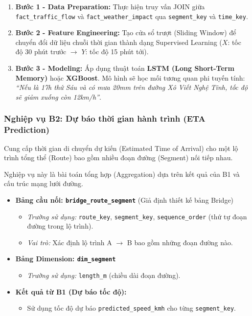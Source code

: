 \begin{enumerate}
    \item \textbf{Bước 1 - Data Preparation:} Thực hiện truy vấn JOIN giữa \texttt{fact\_traffic\_flow} và \texttt{fact\_weather\_impact} qua \texttt{segment\_key} và \texttt{time\_key}.
    \item \textbf{Bước 2 - Feature Engineering:} Tạo cửa sổ trượt (Sliding Window) để chuyển đổi dữ liệu chuỗi thời gian thành dạng Supervised Learning ($X$: tốc độ 30 phút trước $\rightarrow$ $Y$: tốc độ 15 phút tới).
    \item \textbf{Bước 3 - Modeling:} Áp dụng thuật toán \textbf{LSTM (Long Short-Term Memory)} hoặc \textbf{XGBoost}. Mô hình sẽ học mối tương quan phi tuyến tính: \textit{“Nếu là 17h thứ Sáu và có mưa 20mm trên đường Xô Viết Nghệ Tĩnh, tốc độ sẽ giảm xuống còn 12km/h”}.
\end{enumerate}

\subsubsection{Nghiệp vụ B2: Dự báo thời gian hành trình (ETA Prediction)}

Cung cấp thời gian di chuyển dự kiến (Estimated Time of Arrival) cho một lộ trình tổng thể (Route) bao gồm nhiều đoạn đường (Segment) nối tiếp nhau.

Nghiệp vụ này là bài toán tổng hợp (Aggregation) dựa trên kết quả của B1 và cấu trúc mạng lưới đường.

\begin{itemize}
    \item \textbf{Bảng cầu nối: \texttt{bridge\_route\_segment}} (Giả định thiết kế bảng Bridge)
    \begin{itemize}
        \item \textit{Trường sử dụng:} \texttt{route\_key}, \texttt{segment\_key}, \texttt{sequence\_order} (thứ tự đoạn đường trong lộ trình).
        \item \textit{Vai trò:} Xác định lộ trình A $\rightarrow$ B bao gồm những đoạn đường nào.
    \end{itemize}
    \item \textbf{Bảng Dimension: \texttt{dim\_segment}}
    \begin{itemize}
        \item \textit{Trường sử dụng:} \texttt{length\_m} (chiều dài đoạn đường).
    \end{itemize}
    \item \textbf{Kết quả từ B1 (Dự báo tốc độ):}
    \begin{itemize}
        \item Sử dụng tốc độ dự báo \texttt{predicted\_speed\_kmh} cho từng \texttt{segment\_key}.
    \end{itemize}
\end{itemize}

